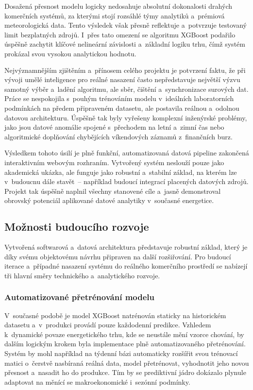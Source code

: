 \documentclass[a4paper]{article}
\begin{document}
Dosažená přesnost modelu logicky nedosahuje absolutní dokonalosti drahých komerčních systémů, za kterými stojí rozsáhlé týmy analytiků a~prémiová meteorologická data. Tento výsledek však přesně reflektuje a~potvrzuje testovaný limit bezplatných zdrojů. I~přes tato omezení se algoritmu XGBoost podařilo úspěšně zachytit klíčové nelineární závislosti a~základní logiku trhu, čímž systém prokázal svou vysokou analytickou hodnotu.

Nejvýznamnějším zjištěním a~přínosem celého projektu je potvrzení faktu, že při vývoji umělé inteligence pro reálné nasazení často nepředstavuje největší výzvu samotný výběr a~ladění algoritmu, ale sběr, čištění a~synchronizace surových dat. Práce se nespokojila s~pouhým trénováním modelu v~ideálních laboratorních podmínkách na předem připraveném datasetu, ale postavila reálnou a~odolnou datovou architekturu. Úspěšně tak byly vyřešeny komplexní inženýrské problémy, jako jsou datové anomálie spojené s~přechodem na letní a~zimní čas nebo algoritmické doplňování chybějících víkendových záznamů z~finančních burz.

Výsledkem tohoto úsilí je plně funkční, automatizovaná datová pipeline zakončená interaktivním webovým rozhraním. Vytvořený systém neslouží pouze jako akademická ukázka, ale funguje jako robustní a~stabilní základ, na kterém lze v~budoucnu dále stavět~-- například budoucí integrací placených datových zdrojů. Projekt tak úspěšně naplnil všechny stanovené cíle a~jasně demonstroval obrovský potenciál aplikované datové analytiky v~současné energetice.

\subsection{Možnosti budoucího rozvoje}
Vytvořená softwarová a~datová architektura představuje robustní základ, který je díky svému objektovému návrhu připraven na další rozšiřování. Pro budoucí iterace a~případné nasazení systému do reálného komerčního prostředí se nabízejí tři hlavní směry technického a~analytického rozvoje.

\subsubsection{Automatizované přetrénování modelu}
V~současné podobě je model XGBoost natrénován staticky na historickém datasetu a~v~produkci provádí pouze každodenní predikce. Vzhledem k~dynamické povaze energetického trhu, kde se neustále mění vzorce chování, by dalším logickým krokem byla implementace plně automatizovaného přetrénování. Systém by mohl například na týdenní bázi automaticky rozšířit svou trénovací matici o~čerstvě nasbíraná reálná data, model přetrénovat, vyhodnotit jeho novou přesnost a~nasadit ho do produkce. Tím by se prediktivní jádro dokázalo plynule adaptovat na měnící se makroekonomické i~sezónní podmínky.
\end{document}
